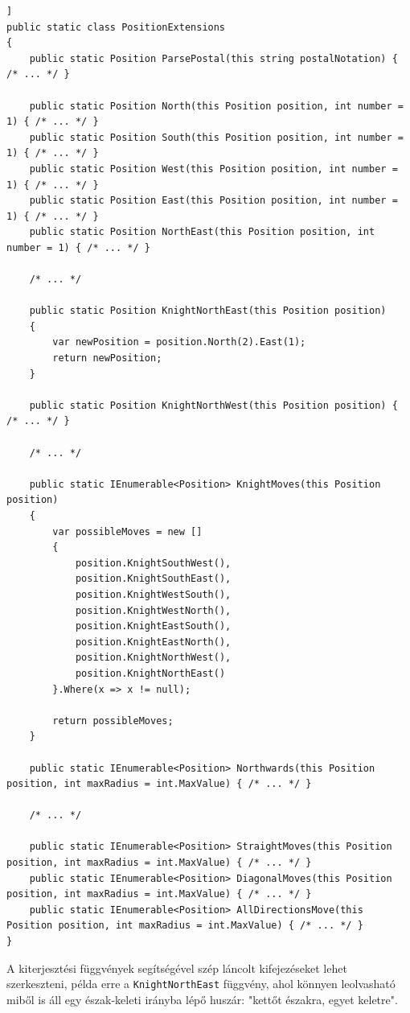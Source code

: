 \documentclass[twoside, a4paper, 12pt]{book}
\begin{document}
\begin{lstlisting}[caption=Pozíciók segédfüggvényes - PositionExtensions osztály, label=lst:chessboardpositionextensions_code, float,floatplacement=H]]
public static class PositionExtensions
{
	public static Position ParsePostal(this string postalNotation) { /* ... */ }

	public static Position North(this Position position, int number = 1) { /* ... */ }
	public static Position South(this Position position, int number = 1) { /* ... */ }
	public static Position West(this Position position, int number = 1) { /* ... */ }
	public static Position East(this Position position, int number = 1) { /* ... */ }
	public static Position NorthEast(this Position position, int number = 1) { /* ... */ }
	
	/* ... */

	public static Position KnightNorthEast(this Position position)
	{
		var newPosition = position.North(2).East(1);
		return newPosition;
	}

	public static Position KnightNorthWest(this Position position) { /* ... */ }

	/* ... */

	public static IEnumerable<Position> KnightMoves(this Position position)
	{
		var possibleMoves = new []
		{
			position.KnightSouthWest(),
			position.KnightSouthEast(),
			position.KnightWestSouth(),
			position.KnightWestNorth(),
			position.KnightEastSouth(),
			position.KnightEastNorth(),
			position.KnightNorthWest(),
			position.KnightNorthEast()
		}.Where(x => x != null);
		
		return possibleMoves;
	}

	public static IEnumerable<Position> Northwards(this Position position, int maxRadius = int.MaxValue) { /* ... */ }

	/* ... */

	public static IEnumerable<Position> StraightMoves(this Position position, int maxRadius = int.MaxValue) { /* ... */ }
	public static IEnumerable<Position> DiagonalMoves(this Position position, int maxRadius = int.MaxValue) { /* ... */ }
	public static IEnumerable<Position> AllDirectionsMove(this Position position, int maxRadius = int.MaxValue) { /* ... */ }
}
\end{lstlisting}

A kiterjesztési függvények segítségével szép láncolt kifejezéseket lehet szerkeszteni, példa erre a \texttt{KnightNorthEast} függvény, ahol könnyen leolvasható miből is áll egy észak-keleti irányba lépő huszár: "kettőt északra, egyet keletre".
\end{document}
